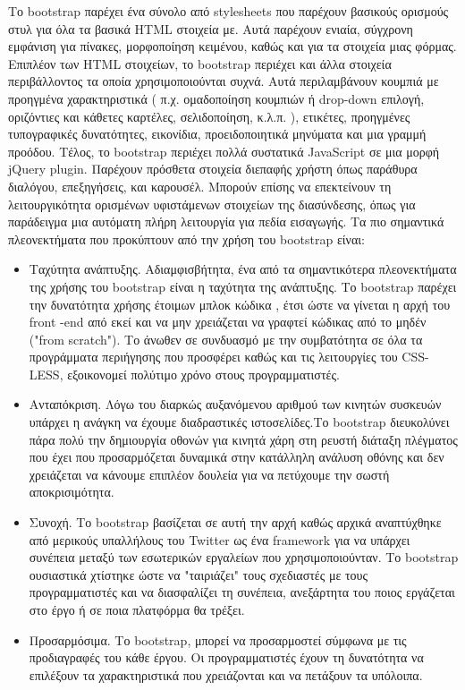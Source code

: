 	Το bootstrap παρέχει ένα σύνολο από stylesheets που παρέχουν βασικούς ορισμούς στυλ για όλα τα βασικά HTML στοιχεία με. Αυτά παρέχουν ενιαία, σύγχρονη εμφάνιση για πίνακες, μορφοποίηση κειμένου, καθώς και για τα στοιχεία μιας φόρμας. Επιπλέον των HTML στοιχείων, το bootstrap περιέχει και άλλα στοιχεία περιβάλλοντος τα οποία χρησιμοποιούνται συχνά. Αυτά περιλαμβάνουν κουμπιά με προηγμένα χαρακτηριστικά ( π.χ. ομαδοποίηση κουμπιών ή drop-down επιλογή, οριζόντιες και κάθετες καρτέλες, σελιδοποίηση, κ.λ.π. ), ετικέτες, προηγμένες τυπογραφικές δυνατότητες, εικονίδια, προειδοποιητικά μηνύματα και μια γραμμή προόδου. Τέλος, το bootstrap περιέχει πολλά συστατικά JavaScript σε μια μορφή jQuery plugin. Παρέχουν πρόσθετα στοιχεία διεπαφής χρήστη όπως παράθυρα διαλόγου, επεξηγήσεις, και καρουσέλ. Μπορούν επίσης να επεκτείνουν τη λειτουργικότητα ορισμένων υφιστάμενων στοιχείων της διασύνδεσης, όπως για παράδειγμα μια αυτόματη πλήρη λειτουργία για πεδία εισαγωγής. \cite{bootstrap}
	Τα πιο σημαντικά πλεονεκτήματα που προκύπτουν από την χρήση του bootstrap είναι:
	\begin{itemize}
	\item Ταχύτητα ανάπτυξης. Αδιαμφισβήτητα, ένα από τα σημαντικότερα πλεονεκτήματα της χρήσης του bootstrap είναι η ταχύτητα της ανάπτυξης. Το bootstrap παρέχει την δυνατότητα χρήσης έτοιμων μπλοκ κώδικα , έτσι ώστε να γίνεται η αρχή του front -end από εκεί και να μην χρειάζεται να γραφτεί κώδικας  από το μηδέν ("from scratch"). Το άνωθεν σε συνδυασμό με την συμβατότητα σε όλα τα προγράμματα περιήγησης που προσφέρει καθώς και τις λειτουργίες του CSS-LESS, εξοικονομεί πολύτιμο χρόνο στους προγραμματιστές.
	\item Ανταπόκριση. Λόγω του διαρκώς αυξανόμενου αριθμού των κινητών συσκευών υπάρχει η ανάγκη να έχουμε διαδραστικές ιστοσελίδες.Το bootstrap διευκολύνει πάρα πολύ την δημιουργία οθονών για κινητά χάρη στη ρευστή διάταξη πλέγματος που έχει που προσαρμόζεται δυναμικά στην κατάλληλη ανάλυση οθόνης και δεν χρειάζεται να κάνουμε επιπλέον δουλεία για να πετύχουμε την σωστή αποκρισιμότητα.
	\item Συνοχή. Το bootstrap βασίζεται σε αυτή την αρχή καθώς αρχικά αναπτύχθηκε από μερικούς υπαλλήλους του Twitter ως ένα framework για να υπάρχει συνέπεια μεταξύ των εσωτερικών εργαλείων που χρησιμοποιούνταν. 
Το bootstrap ουσιαστικά χτίστηκε ώστε να "ταιριάζει" τους σχεδιαστές με τους προγραμματιστές και να διασφαλίζει τη συνέπεια, ανεξάρτητα του ποιος εργάζεται στο έργο ή σε ποια πλατφόρμα θα τρέξει.
	\item Προσαρμόσιμα. Το bootstrap, μπορεί να προσαρμοστεί σύμφωνα με τις προδιαγραφές του κάθε έργου. Οι προγραμματιστές έχουν τη δυνατότητα να επιλέξουν τα χαρακτηριστικά που χρειάζονται και να πετάξουν τα υπόλοιπα.
	\end{itemize}

